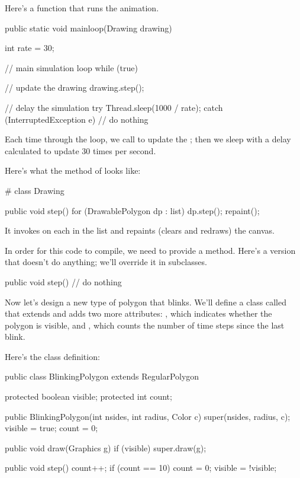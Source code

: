 Here's a  function that runs the animation.

\begin{code}
    public static void mainloop(Drawing drawing) {
        int rate = 30;
        
        // main simulation loop
        while (true) {

            // update the drawing
            drawing.step();

            // delay the simulation
            try {
                Thread.sleep(1000 / rate);
            } catch (InterruptedException e) {
                // do nothing
            }
        }
    }
\end{code}

Each time through the loop, we call  to update the ; then we sleep with a delay calculated to update 30 times per second.

Here's what the  method of  looks like:
\begin{code}
# class Drawing

public void step() {
    for (DrawablePolygon dp : list) {
        dp.step();
    }
    repaint();
}
\end{code}

It invokes  on each  in the list and repaints (clears and redraws) the canvas.

In order for this code to compile, we need  to provide a  method.
Here's a version that doesn't do anything; we'll override it in subclasses.

\begin{code}
public void step() {
    // do nothing
}
\end{code}

Now let's design a new type of polygon that blinks.
We'll define a class called  that extends  and adds two more attributes: , which indicates whether the polygon is visible, and , which counts the number of time steps since the last blink.

Here's the class definition:

\begin{code}
public class BlinkingPolygon extends RegularPolygon {
    protected boolean visible;
    protected int count;

    public BlinkingPolygon(int nsides, int radius, Color c) {
        super(nsides, radius, c);
        visible = true;
        count = 0;
    }

    public void draw(Graphics g) {
        if (visible) {
            super.draw(g);
        }
    }

    public void step() {
        count++;
        if (count == 10) {
            count = 0;
            visible = !visible;
        }
    }
}
\end{code}

